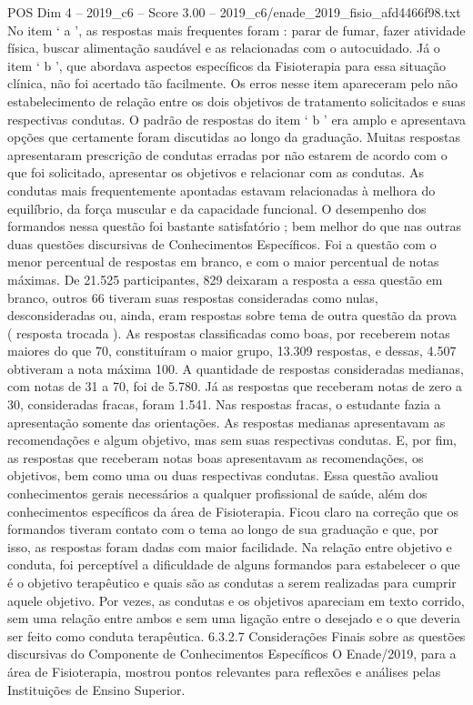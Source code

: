 \begin{textsample}{POS Dim 4 – 2019\_c6 – Score 3.00 – 2019\_c6/enade\_2019\_fisio\_afd4466f98.txt}
No item ‘ a ’, as respostas mais frequentes foram : parar de fumar, fazer atividade física, buscar alimentação saudável e as relacionadas com o autocuidado.
Já o item ‘ b ’, que abordava aspectos específicos da Fisioterapia para essa situação clínica, não foi acertado tão facilmente.
Os erros nesse item apareceram pelo não estabelecimento de relação entre os dois objetivos de tratamento solicitados e suas respectivas condutas.
O padrão de respostas do item ‘ b ’ era amplo e apresentava opções que certamente foram discutidas ao longo da graduação.
Muitas respostas apresentaram prescrição de condutas erradas por não estarem de acordo com o que foi solicitado, apresentar os objetivos e relacionar com as condutas.
As condutas mais frequentemente apontadas estavam relacionadas à melhora do equilíbrio, da força muscular e da capacidade funcional.
O desempenho dos formandos nessa questão foi bastante satisfatório ; bem melhor do que nas outras duas questões discursivas de Conhecimentos Específicos.
Foi a questão com o menor percentual de respostas em branco, e com o maior percentual de notas máximas.
De 21.525 participantes, 829 deixaram a resposta a essa questão em branco, outros 66 tiveram suas respostas consideradas como nulas, desconsideradas ou, ainda, eram respostas sobre tema de outra questão da prova ( resposta trocada ).
As respostas classificadas como boas, por receberem notas maiores do que 70, constituíram o maior grupo, 13.309 respostas, e dessas, 4.507 obtiveram a nota máxima 100.
A quantidade de respostas consideradas medianas, com notas de 31 a 70, foi de 5.780.
Já as respostas que receberam notas de zero a 30, consideradas fracas, foram 1.541.
Nas respostas fracas, o estudante fazia a apresentação somente das orientações.
As respostas medianas apresentavam as recomendações e algum objetivo, mas sem suas respectivas condutas.
E, por fim, as respostas que receberam notas boas apresentavam as recomendações, os objetivos, bem como uma ou duas respectivas condutas.
Essa questão avaliou conhecimentos gerais necessários a qualquer profissional de saúde, além dos conhecimentos específicos da área de Fisioterapia.
Ficou claro na correção que os formandos tiveram contato com o tema ao longo de sua graduação e que, por isso, as respostas foram dadas com maior facilidade.
Na relação entre objetivo e conduta, foi perceptível a dificuldade de alguns formandos para estabelecer o que é o objetivo terapêutico e quais são as condutas a serem realizadas para cumprir aquele objetivo.
Por vezes, as condutas e os objetivos apareciam em texto corrido, sem uma relação entre ambos e sem uma ligação entre o desejado e o que deveria ser feito como conduta terapêutica. 6.3.2.7 Considerações Finais sobre as questões discursivas do Componente de Conhecimentos Específicos O Enade/2019, para a área de Fisioterapia, mostrou pontos relevantes para reflexões e análises pelas Instituições de Ensino Superior.

\end{textsample}

